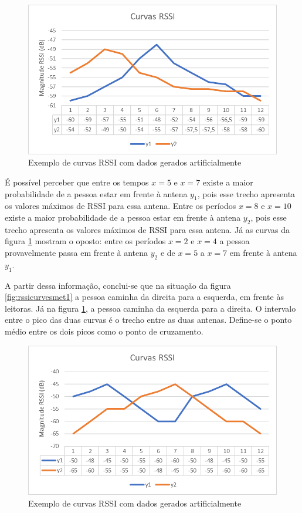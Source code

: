  \begin{figure}[h]
    \centering
    \includegraphics[width=0.8\linewidth]{figs/Metodologia/image005.png}
    \caption{Exemplo de curvas RSSI com dados gerados artificialmente}
    \label{fig:rssicurvesmet2}
\end{figure}
 
 É possível perceber que entre os tempos $x=5$ e $x=7$ existe a maior probabilidade de a pessoa estar em frente à antena $y_1$, pois esse trecho apresenta os valores máximos de RSSI para essa antena. Entre os períodos $x=8$ e $x=10$ existe a maior probabilidade de a pessoa estar em frente à antena $y_2$, pois esse trecho apresenta os valores máximos de RSSI para essa antena. Já as curvas da figura \ref{fig:rssicurvesmet2} mostram o oposto: entre os períodos $x=2$ e $x=4$ a pessoa provavelmente passa em frente à antena $y_2$ e de $x=5$ a $x=7$ em frente à antena $y_1$.
 
 A partir dessa informação, conclui-se que na situação da figura \ref{fig:rssicurvesmet1} a pessoa caminha da direita para a esquerda, em frente às leitoras. Já na figura \ref{fig:rssicurvesmet2}, a pessoa caminha da esquerda para a direita. O intervalo entre o pico das duas curvas é o trecho entre as duas antenas. Define-se o ponto médio entre os dois picos como o ponto de cruzamento.
 
  \begin{figure}[h]
    \centering
    \includegraphics[width=0.8\linewidth]{figs/Metodologia/curvas1.png}
    \caption{Exemplo de curvas RSSI com dados gerados artificialmente}
    \label{fig:rssicurvesmet3}
\end{figure}

